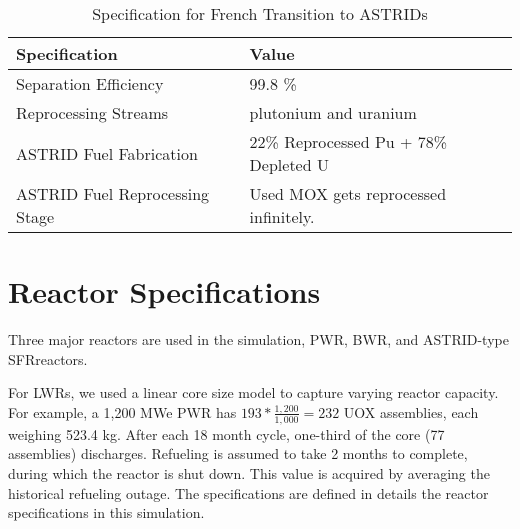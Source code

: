 \begin{table}[h]
	\centering
	\begin{tabularx}{\textwidth}{bb}
		\hline
		\textbf{Specification }& \textbf{Value} \\
		\hline
		Separation Efficiency & 99.8 \% \\
		Reprocessing Streams & plutonium and uranium \\
		\gls{ASTRID} Fuel Fabrication &  \small{22\% Reprocessed Pu + 78\% Depleted U}  \\
		\gls{ASTRID} Fuel Reprocessing Stage &  Used \gls{MOX} gets reprocessed infinitely. \\
		\hline
	\end{tabularx}
	\caption {Specification for French Transition to \glspl{ASTRID} }
	\label{tab:sim_france}
\end{table}


\section{Reactor Specifications}
Three major reactors are used in the simulation, \gls{PWR}, \gls{BWR}, and ASTRID-type \gls{SFR}reactors.

For \glspl{LWR}, we used a linear core size model to capture
varying reactor capacity. For example, a 
1,200 MWe PWR has $193*\frac{1,200}{1,000} = 232$ \gls{UOX} assemblies, each
weighing 523.4 kg.
After each 18 month cycle, one-third of the 
core (77 assemblies) discharges. Refueling
is assumed to take 2 months to complete, during which the reactor
is shut down. This value is acquired by averaging the 
historical refueling outage. The specifications are defined in 
 details the reactor specifications in this simulation.

